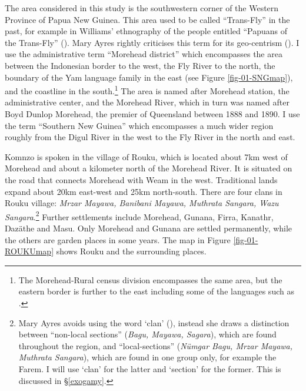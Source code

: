 The area considered in this study is the southwestern corner of the Western Province of Papua New Guinea. This area used to be called ``Trans-Fly'' in the past, for example in Williams' ethnography of the  people entitled ``Papuans of the Trans-Fly'' (\citeyear{Williams:1936transfly}). Mary Ayres rightly criticises this term for its geo-centrism (\citeyear[1]{Ayres:ws}). I use the administrative term ``Morehead district'' which encompasses the area between the Indonesian border to the west, the Fly River to the north, the boundary of the Yam language family in the east (see Figure \ref{fig-01-SNGmap}), and the coastline in the south.\footnote{The Morehead-Rural census division encompasses the same area, but the eastern border is further to the east including some of the  languages such as .} The area is named after Morehead station, the administrative center, and the Morehead River, which in turn was named after Boyd Dunlop Morehead, the premier of Queensland between 1888 and 1890. I use the term ``Southern New Guinea'' which encompasses a much wider region roughly from the Digul River in the west to the Fly River in the north and east.

Komnzo is spoken in the village of Rouku, which is located about 7km west of Morehead and about a kilometer north of the Morehead River. It is situated on the road that connects Morehead with Weam in the west. Traditional lands expand about 20km east-west and 25km north-south. There are four clans in Rouku village: \emph{Mrzar Mayawa, Banibani Mayawa, Muthrata Sangara, Wazu Sangara}.\footnote{Mary Ayres avoids using the word `clan' (\citeyear[142]{Ayres:ws}), instead she draws a distinction between ``non-local sections'' (\emph{Bagu, Mayawa, Sagara}), which are found throughout the region, and ``local-sections'' (\emph{Nümgar Bagu, Mrzar Mayawa, Muthrata Sangara}), which are found in one group only, for example the Farem. I will use `clan' for the latter and `section' for the former. This is discussed in \S\ref{exogamy}.} Further settlements include Morehead, Gunana, Firra, Kanathr, Ŋazäthe and Masu. Only Morehead and Gunana are settled permanently, while the others are garden places in some years. The map in Figure \ref{fig-01-ROUKUmap} shows Rouku and the surrounding places.

